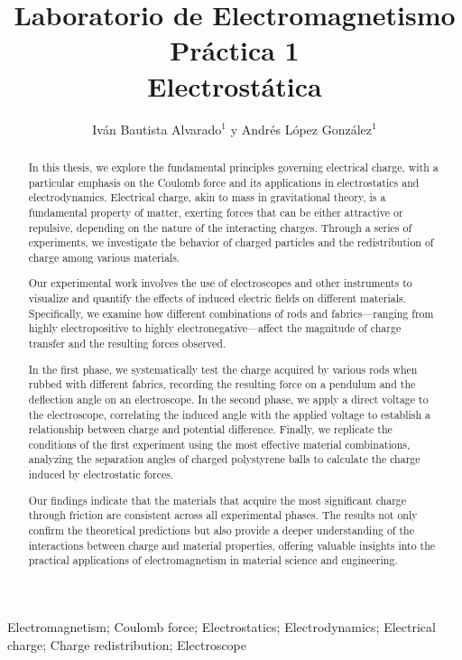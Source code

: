 \documentclass[article,12pt]{elsarticle}
\begin{document}
\begin{frontmatter}
    \title{Laboratorio de Electromagnetismo \\  Práctica  1\\ 
        Electrostática}
    \author{Iván Bautista Alvarado$^1$ y Andrés López González$^1$} %
    \address{$^1$ Facultad de Ciencias, Universidad Nacional Autónoma de México, M\'exico CDMX.}


    \begin{abstract}
     In this thesis, we explore the fundamental principles governing electrical charge, with a particular emphasis on the Coulomb force and its applications in electrostatics and electrodynamics. Electrical charge, akin to mass in gravitational theory, is a fundamental property of matter, exerting forces that can be either attractive or repulsive, depending on the nature of the interacting charges. Through a series of experiments, we investigate the behavior of charged particles and the redistribution of charge among various materials.

Our experimental work involves the use of electroscopes and other instruments to visualize and quantify the effects of induced electric fields on different materials. Specifically, we examine how different combinations of rods and fabrics—ranging from highly electropositive to highly electronegative—affect the magnitude of charge transfer and the resulting forces observed.

In the first phase, we systematically test the charge acquired by various rods when rubbed with different fabrics, recording the resulting force on a pendulum and the deflection angle on an electroscope. In the second phase, we apply a direct voltage to the electroscope, correlating the induced angle with the applied voltage to establish a relationship between charge and potential difference. Finally, we replicate the conditions of the first experiment using the most effective material combinations, analyzing the separation angles of charged polystyrene balls to calculate the charge induced by electrostatic forces.

Our findings indicate that the materials that acquire the most significant charge through friction are consistent across all experimental phases. The results not only confirm the theoretical predictions but also provide a deeper understanding of the interactions between charge and material properties, offering valuable insights into the practical applications of electromagnetism in material science and engineering.
    \end{abstract}

    \begin{keyword}
     Electromagnetism; Coulomb force; Electrostatics; Electrodynamics; Electrical charge; Charge redistribution; Electroscope
    \end{keyword}
\end{frontmatter}
\end{document}
